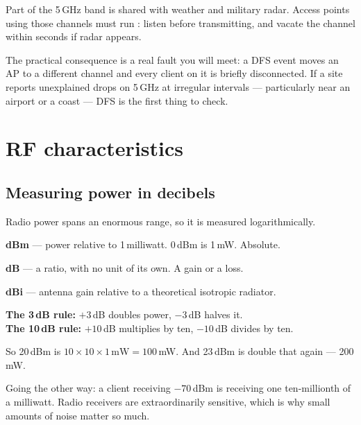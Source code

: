 \begin{conceptbox}
Part of the 5\,GHz band is shared with weather and military radar. Access points
using those channels must run : listen before
transmitting, and vacate the channel within seconds if radar appears.

The practical consequence is a real fault you will meet: a DFS event moves an AP
to a different channel and every client on it is briefly disconnected. If a site
reports unexplained drops on 5\,GHz at irregular intervals --- particularly near
an airport or a coast --- DFS is the first thing to check.
\end{conceptbox}

\section{RF characteristics}

\subsection{Measuring power in decibels}

Radio power spans an enormous range, so it is measured logarithmically.

\begin{tight}
  \item \textbf{dBm} --- power relative to 1\,milliwatt. 0\,dBm is 1\,mW.
        Absolute.
  \item \textbf{dB} --- a ratio, with no unit of its own. A gain or a loss.
  \item \textbf{dBi} --- antenna gain relative to a theoretical isotropic
        radiator.
\end{tight}

\begin{worked}
\textbf{The 3\,dB rule:} $+3$\,dB doubles power, $-3$\,dB halves it.\\
\textbf{The 10\,dB rule:} $+10$\,dB multiplies by ten, $-10$\,dB divides by ten.

So 20\,dBm is $10 \times 10 \times 1\,\text{mW} = 100\,$mW. And 23\,dBm is
double that again --- 200\,mW.

Going the other way: a client receiving $-70$\,dBm is receiving one ten-millionth
of a milliwatt. Radio receivers are extraordinarily sensitive, which is why small
amounts of noise matter so much.
\end{worked}

